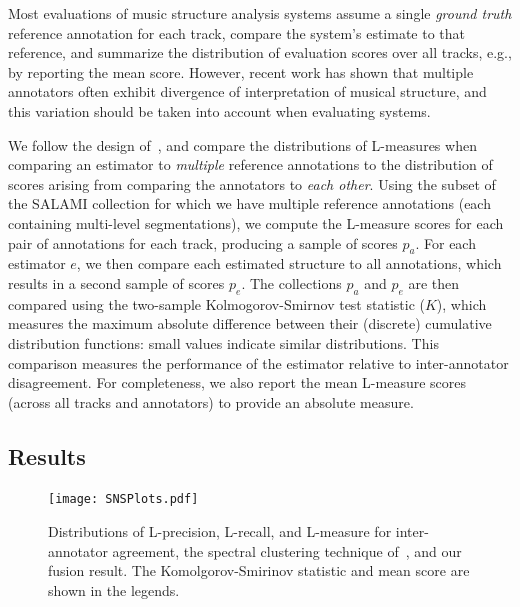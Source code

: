 \documentclass{article}
\begin{document}
Most evaluations of music structure analysis systems assume a single \emph{ground truth} reference annotation for each track, compare the system's estimate to that reference, and summarize the distribution of evaluation scores over all tracks, e.g., by reporting the mean score.
However, recent work has shown that multiple annotators often exhibit divergence of interpretation of musical structure, and this variation should be taken into account when evaluating systems.

We follow the design of~\cite{mcfee2017evaluating}, and compare the distributions of L-measures when comparing an estimator to \emph{multiple} reference annotations to the distribution of scores arising from comparing the annotators to \emph{each other}.
Using the subset of the SALAMI collection for which we have multiple reference annotations (each containing multi-level segmentations), we compute the L-measure scores for each pair of annotations for each track, producing a sample of scores $p_a$.
For each estimator $e$, we then compare each estimated structure to all annotations, which results in a second sample of scores $p_e$.
The collections $p_a$ and $p_e$ are then compared using the two-sample Kolmogorov-Smirnov test statistic ($K$), which measures the maximum absolute difference between their (discrete) cumulative distribution functions: small values indicate similar distributions.
This comparison measures the performance of the estimator relative to inter-annotator disagreement.
For completeness, we also report the mean L-measure scores (across all tracks and annotators) to provide an absolute measure.


\subsection{Results}\label{sec:results}
\begin{figure}
    \centering
    \texttt{[image: SNSPlots.pdf]}
    \caption{Distributions of L-precision, L-recall, and L-measure for inter-annotator agreement, the spectral clustering technique of~\cite{mcfee2014spectral}, and our fusion result.  The Komolgorov-Smirinov statistic and mean score are shown in the legends.}\label{fig:PRLDists}
\end{figure}
   
\end{document}
